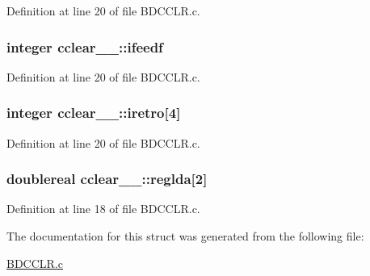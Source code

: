 Definition at line 20 of file B\+D\+C\+C\+L\+R.\+c.

\subsubsection[{\texorpdfstring{ifeedf}{ifeedf}}]{\setlength{\rightskip}{0pt plus 5cm}integer cclear\+\_\+\_\+\+::ifeedf}\hypertarget{structcclear__1___ad6c037e974060d20a412097dd58ba26a}{}\label{structcclear__1___ad6c037e974060d20a412097dd58ba26a}


Definition at line 20 of file B\+D\+C\+C\+L\+R.\+c.

\subsubsection[{\texorpdfstring{iretro}{iretro}}]{\setlength{\rightskip}{0pt plus 5cm}integer cclear\+\_\+\_\+\+::iretro\mbox{[}4\mbox{]}}\hypertarget{structcclear__1___a5242b62d5db814a2fed56dbd375ff7d6}{}\label{structcclear__1___a5242b62d5db814a2fed56dbd375ff7d6}


Definition at line 20 of file B\+D\+C\+C\+L\+R.\+c.

\subsubsection[{\texorpdfstring{reglda}{reglda}}]{\setlength{\rightskip}{0pt plus 5cm}doublereal cclear\+\_\+\_\+\+::reglda\mbox{[}2\mbox{]}}\hypertarget{structcclear__1___afb870c7c64305648bb770a0784f49b71}{}\label{structcclear__1___afb870c7c64305648bb770a0784f49b71}


Definition at line 18 of file B\+D\+C\+C\+L\+R.\+c.



The documentation for this struct was generated from the following file\+:\begin{DoxyCompactItemize}
\item 
\hyperlink{BDCCLR_8c}{B\+D\+C\+C\+L\+R.\+c}\end{DoxyCompactItemize}
